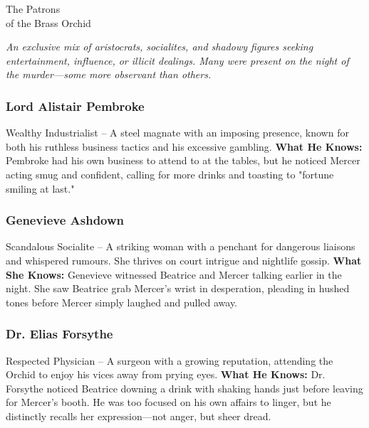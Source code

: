 
\begin{NPC}[description=The elite clientele of the Orchid]{The Patrons\\ of the Brass Orchid}
	
    \emph{An exclusive mix of aristocrats, socialites, and shadowy figures seeking entertainment, influence, or illicit dealings. Many were present on the night of the murder—some more observant than others.}
        
	\subsubsection*{Lord Alistair Pembroke}
	Wealthy Industrialist – A steel magnate with an imposing presence, known for both his ruthless business tactics and his excessive gambling.  
	\textbf{What He Knows:} Pembroke had his own business to attend to at the tables, but he noticed Mercer acting smug and confident, calling for more drinks and toasting to "fortune smiling at last." 

	\subsubsection*{Genevieve Ashdown}
	Scandalous Socialite – A striking woman with a penchant for dangerous liaisons and whispered rumours. She thrives on court intrigue and nightlife gossip.
	\textbf{What She Knows:} Genevieve witnessed Beatrice and Mercer talking earlier in the night. She saw Beatrice grab Mercer’s wrist in desperation, pleading in hushed tones before Mercer simply laughed and pulled away.

	\subsubsection*{Dr. Elias Forsythe}
	Respected Physician – A surgeon with a growing reputation, attending the Orchid to enjoy his vices away from prying eyes.
	\textbf{What He Knows:} Dr. Forsythe noticed Beatrice downing a drink with shaking hands just before leaving for Mercer’s booth. He was too focused on his own affairs to linger, but he distinctly recalls her expression—not anger, but sheer dread.
\end{NPC}
